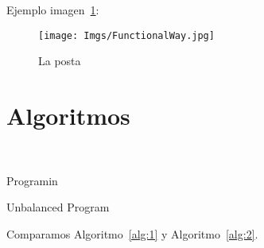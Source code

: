 Ejemplo imagen~\ref{figure:functional}:

\begin{figure}[!ht]
	\centering
	\texttt{[image: Imgs/FunctionalWay.jpg]}
	\caption{\label{figure:functional} La posta}
\end{figure}

\newpage{}

\section{Algoritmos}
~\label{cap:example:sec:algorithms}

\begin{algorithm}
	\caption{Programin}\label{alg:1}
	\begin{algorithmic}[1]
		\EndFor{}
		\EndProcedure{}
	\end{algorithmic}
\end{algorithm}

\begin{algorithm}
	\caption{Unbalanced Program}\label{alg:2}
	\begin{algorithmic}[1]
		\Else{}
		\EndIf{}
		\Else{}
		\EndIf{}
		\EndProcedure{}
	\end{algorithmic}
\end{algorithm}

Comparamos Algoritmo~\ref{alg:1} y Algoritmo~\ref{alg:2}.
